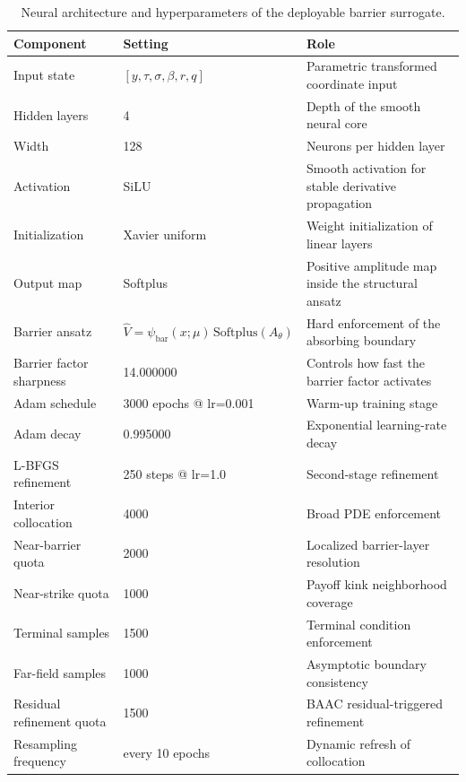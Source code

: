 \begin{table}
\caption{Neural architecture and hyperparameters of the deployable barrier surrogate.}
\label{tab:chapter4_architecture}
\begin{tabular}{lll}
\toprule
Component & Setting & Role \\
\midrule
Input state & $[y,\tau,\sigma,\beta,r,q]$ & Parametric transformed coordinate input \\
Hidden layers & 4 & Depth of the smooth neural core \\
Width & 128 & Neurons per hidden layer \\
Activation & SiLU & Smooth activation for stable derivative propagation \\
Initialization & Xavier uniform & Weight initialization of linear layers \\
Output map & Softplus & Positive amplitude map inside the structural ansatz \\
Barrier ansatz & $\hat V=\psi_{\mathrm{bar}}(x;\mu)\,\mathrm{Softplus}(A_\theta)$ & Hard enforcement of the absorbing boundary \\
Barrier factor sharpness & 14.000000 & Controls how fast the barrier factor activates \\
Adam schedule & 3000 epochs @ lr=0.001 & Warm-up training stage \\
Adam decay & 0.995000 & Exponential learning-rate decay \\
L-BFGS refinement & 250 steps @ lr=1.0 & Second-stage refinement \\
Interior collocation & 4000 & Broad PDE enforcement \\
Near-barrier quota & 2000 & Localized barrier-layer resolution \\
Near-strike quota & 1000 & Payoff kink neighborhood coverage \\
Terminal samples & 1500 & Terminal condition enforcement \\
Far-field samples & 1000 & Asymptotic boundary consistency \\
Residual refinement quota & 1500 & BAAC residual-triggered refinement \\
Resampling frequency & every 10 epochs & Dynamic refresh of collocation \\
\bottomrule
\end{tabular}
\end{table}
